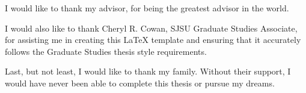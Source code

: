 I would like to thank my advisor, for being the greatest advisor in the world.

I would also like to thank Cheryl R. Cowan, SJSU Graduate Studies Associate, for assisting me in creating this LaTeX template and ensuring that it accurately follows the Graduate Studies thesis style requirements.

Last, but not least, I would like to thank my family. Without their support, I would have never been able to complete this thesis or pursue my dreams.